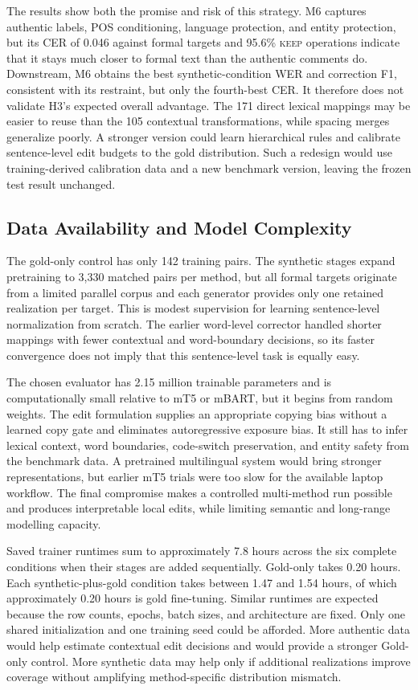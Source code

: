 \documentclass[12pt, a4paper, twoside, openany]{report}
\begin{document}
The results show both the promise and risk of this strategy. M6 captures authentic labels, POS conditioning, language protection, and entity protection, but its CER of 0.046 against formal targets and 95.6\% \textsc{keep} operations indicate that it stays much closer to formal text than the authentic comments do. Downstream, M6 obtains the best synthetic-condition WER and correction F1, consistent with its restraint, but only the fourth-best CER. It therefore does not validate H3's expected overall advantage. The 171 direct lexical mappings may be easier to reuse than the 105 contextual transformations, while spacing merges generalize poorly. A stronger version could learn hierarchical rules and calibrate sentence-level edit budgets to the gold distribution. Such a redesign would use training-derived calibration data and a new benchmark version, leaving the frozen test result unchanged.

\subsection{Data Availability and Model Complexity}

The gold-only control has only 142 training pairs. The synthetic stages expand pretraining to 3,330 matched pairs per method, but all formal targets originate from a limited parallel corpus and each generator provides only one retained realization per target. This is modest supervision for learning sentence-level normalization from scratch. The earlier word-level corrector handled shorter mappings with fewer contextual and word-boundary decisions, so its faster convergence does not imply that this sentence-level task is equally easy.

The chosen evaluator has 2.15 million trainable parameters and is computationally small relative to mT5 or mBART, but it begins from random weights. The edit formulation supplies an appropriate copying bias without a learned copy gate and eliminates autoregressive exposure bias. It still has to infer lexical context, word boundaries, code-switch preservation, and entity safety from the benchmark data. A pretrained multilingual system would bring stronger representations, but earlier mT5 trials were too slow for the available laptop workflow. The final compromise makes a controlled multi-method run possible and produces interpretable local edits, while limiting semantic and long-range modelling capacity.

Saved trainer runtimes sum to approximately 7.8 hours across the six complete conditions when their stages are added sequentially. Gold-only takes 0.20 hours. Each synthetic-plus-gold condition takes between 1.47 and 1.54 hours, of which approximately 0.20 hours is gold fine-tuning. Similar runtimes are expected because the row counts, epochs, batch sizes, and architecture are fixed. Only one shared initialization and one training seed could be afforded. More authentic data would help estimate contextual edit decisions and would provide a stronger Gold-only control. More synthetic data may help only if additional realizations improve coverage without amplifying method-specific distribution mismatch.
\end{document}

